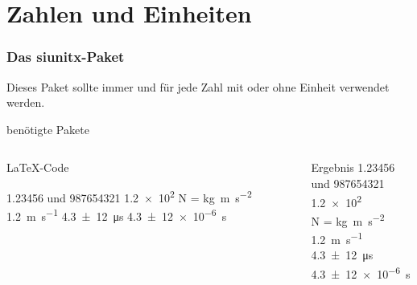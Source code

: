 \section{Zahlen und Einheiten}
\begin{frame}[fragile]
    \frametitle{Das siunitx-Paket}
    Dieses Paket sollte immer und für jede Zahl mit oder ohne Einheit verwendet werden.

   \begin{block}{benötigte Pakete}
    \begin{lstverbatim}
        \usepackage[locale=DE, separate-uncertainty=true, per-mode=fraction]
                   {siunitx}
    \end{lstverbatim}
   \end{block}
    \begin{columns}[T]
        \begin{column}{0.6\textwidth}
            \begin{block}{\LaTeX-Code}
                \begin{lstverbatim}
                \num{1.23456} und \num{987654321}
                \num{1.2e2}
                \si{\newton} = \si{\kilo\gram\metre\per\second\squared}
                \SI{1.2}{\metre\per\second}
                \SI{4,3(12)}{\micro\second}
                \SI{4,3(12)e-6}{\second}
                \end{lstverbatim}
            \end{block}
        \end{column}
        \begin{column}{0.35\textwidth}
            \begin{block}{Ergebnis}
                \num{1.23456} und \num{987654321} \\
                \num{1.2e2} \\
                \smallbreak
                \si{\newton} = \si{\kilo\gram\metre\per\second\squared} \\
                \medbreak
                \SI{1.2}{\metre\per\second} \\
                \SI{4,3(12)}{\micro\second}
                \SI{4,3(12)e-6}{\second}
            \end{block}
        \end{column}
    \end{columns}
\end{frame}

